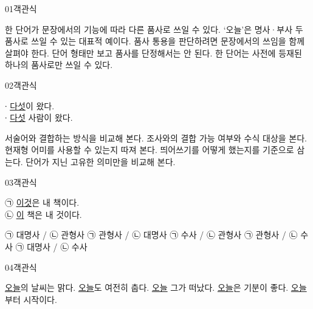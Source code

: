 \documentclass[fs9,seriesRus]{korfarm-base}
\begin{document}

\par\medskip
\kfBeginMC
\begin{kfQBlock}{01}{객관식}
\begin{kfChoices}
\kfChoice 한 단어가 문장에서의 기능에 따라 다른 품사로 쓰일 수 있다.
\kfChoice ‘오늘’은 명사·부사 두 품사로 쓰일 수 있는 대표적 예이다.
\kfChoice 품사 통용을 판단하려면 문장에서의 쓰임을 함께 살펴야 한다.
\kfChoice 단어 형태만 보고 품사를 단정해서는 안 된다.
\kfChoice 한 단어는 사전에 등재된 하나의 품사로만 쓰일 수 있다.
\end{kfChoices}
\end{kfQBlock}
\begin{kfQBlock}{02}{객관식}
\begin{kfEvidence}∙  \uline{다섯}이 왔다.   \\\relax
   ∙  \uline{다섯} 사람이 왔다.\end{kfEvidence}
\begin{kfChoices}
\kfChoice 서술어와 결합하는 방식을 비교해 본다.
\kfChoice 조사와의 결합 가능 여부와 수식 대상을 본다.
\kfChoice 현재형 어미를 사용할 수 있는지 따져 본다.
\kfChoice 띄어쓰기를 어떻게 했는지를 기준으로 삼는다.
\kfChoice 단어가 지닌 고유한 의미만을 비교해 본다.
\end{kfChoices}
\end{kfQBlock}
\begin{kfQBlock}{03}{객관식}
\begin{kfEvidence}㉠ \uline{이것}은 내 책이다. \\\relax
㉡ \uline{이} 책은 내 것이다.\end{kfEvidence}
\begin{kfChoices}
\kfChoice ㉠ 대명사 / ㉡ 관형사
\kfChoice ㉠ 관형사 / ㉡ 대명사
\kfChoice ㉠ 수사 / ㉡ 관형사
\kfChoice ㉠ 관형사 / ㉡ 수사
\kfChoice ㉠ 대명사 / ㉡ 수사
\end{kfChoices}
\end{kfQBlock}
\begin{kfQBlock}{04}{객관식}
\begin{kfChoices}
\kfChoice \uline{오늘}의 날씨는 맑다.
\kfChoice \uline{오늘}도 여전히 춥다.
\kfChoice \uline{오늘} 그가 떠났다.
\kfChoice \uline{오늘}은 기분이 좋다.
\kfChoice \uline{오늘}부터 시작이다.
\end{kfChoices}
\end{kfQBlock}
\end{document}
